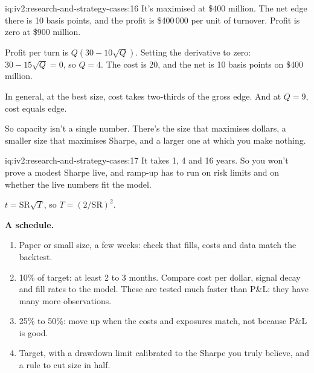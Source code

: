 \begin{solution}{iq:iv2:research-and-strategy-cases:16}
It's maximised at \$400 million. The net edge there is 10 basis points, and the profit is \$400\,000 per unit of turnover. Profit is zero at \$900 million.

Profit per turn is $Q(30 - 10\sqrt{Q})$. Setting the derivative to zero: $30 - 15\sqrt{Q} = 0$, so $Q = 4$. The cost is 20, and the net is 10 basis points on \$400 million.

In general, at the best size, cost takes two-thirds of the gross edge. And at $Q = 9$, cost equals edge.

So capacity isn't a single number. There's the size that maximises dollars, a smaller size that maximises Sharpe, and a larger one at which you make nothing.

\end{solution}

\begin{solution}{iq:iv2:research-and-strategy-cases:17}
It takes 1, 4 and 16 years. So you won't prove a modest Sharpe live, and ramp-up has to run on risk limits and on whether the live numbers fit the model.

$t = \mathrm{SR}\sqrt{T}$, so $T = (2/\mathrm{SR})^2$.

\textbf{A schedule.}
\begin{enumerate}
\item Paper or small size, a few weeks: check that fills, costs and data match the backtest.
\item 10\% of target: at least 2 to 3 months. Compare cost per dollar, signal decay and fill rates to the model. These are tested much faster than P\&L: they have many more observations.
\item 25\% to 50\%: move up when the costs and exposures match, not because P\&L is good.
\item Target, with a drawdown limit calibrated to the Sharpe you truly believe, and a rule to cut size in half.
\end{enumerate}

\end{solution}

